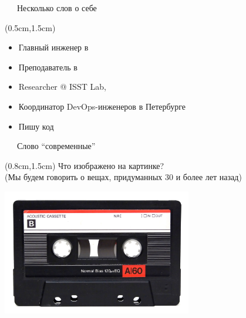 \documentclass[xetex,18pt,aspectratio=43]{beamer}
\begin{document}
\begin{Large}
\begin{frame}{\ \ \ Несколько слов о себе}
\begin{textblock*}{\framewidth-0.8cm}(0.5cm,1.5cm)
\begin{itemize}
  \item Главный инженер в \href{https://gitinsky.com}{\color{blue}{Git in Sky}}
  \item Преподаватель в \href{http://avalon.ru}{\color{blue}{avalon.ru}}
  \item Researcher @ ISST Lab, \href{http://ifmo.ru}{\color{blue}{ITMO}}
  \item Координатор \href{https://meetup.com/DevOps-40}{\color{blue}{встреч}} DevOps-инженеров в Петербурге
  \item Пишу код
\end{itemize}
\end{textblock*}
\end{frame}

\begin{frame}{\ \ \ Слово \enquote{современные}}
\begin{textblock*}{\framewidth}(0.8cm,1.5cm)
Что изображено на картинке?\\
{\small (Мы будем говорить о вещах, придуманных 30 и более лет назад)}
\begin{minipage}{\textwidth}
  \centering
  \includegraphics[height=5.5cm]{img/cassette}
\end{minipage}
\end{textblock*}
\end{frame}


\end{Large}
\end{document}
